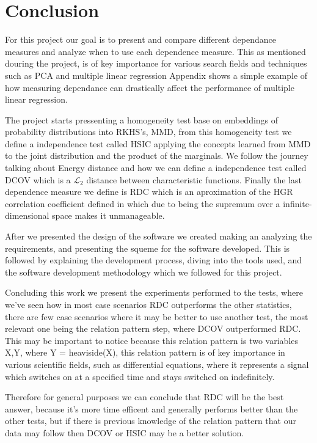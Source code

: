 \section{Conclusion}

For this project our goal is to present and compare different dependance measures and analyze when to use each dependence measure. This as mentioned douring the project, is of key importance for various search fields and techniques such as PCA and multiple linear regression Appendix \label{Appendix:Sobras} shows a simple example of how measuring dependance can drastically affect the performance of multiple linear regression.

The project starts pressenting a homogeneity test base on embeddings of probability distributions into RKHS's, MMD, from this homogeneity test we define a independence test called HSIC applying the concepts learned from MMD to the joint distribution and the product of the marginals. We follow the journey talking about Energy distance and how we can define a independence test called DCOV which is a $\mathcal{L}_{2}$ distance between characteristic functions. Finally the last dependence measure we define is RDC which is an aproximation of the HGR correlation coefficient defined in \cite{HGR_text} which due to being the supremum over a infinite-dimensional space makes it unmanageable.

After we presented the design of the software we created making an analyzing the requirements, and presenting the squeme for the software developed. This is followed by explaining the development process, diving into the tools used, and the software development methodology which we followed for this project.

Concluding this work we present the experiments performed to the tests, where we've seen how in most case scenarios RDC outperforms the other statistics, there are few case scenarios where it may be better to use another test, the most relevant one being the relation pattern step, where DCOV outperformed RDC. This may be important to notice because this relation pattern is two variables X,Y, where Y = heaviside(X), this relation pattern is of key importance in various scientific fields, such as differential equations, where it represents a signal which switches on at a specified time and stays switched on indefinitely. 

Therefore for general purposes  we can conclude that RDC will be the best answer, because it's more time efficent and generally performs better than the other tests, but if there is previous knowledge of the relation pattern that our data may follow then DCOV or HSIC may be a better solution.

